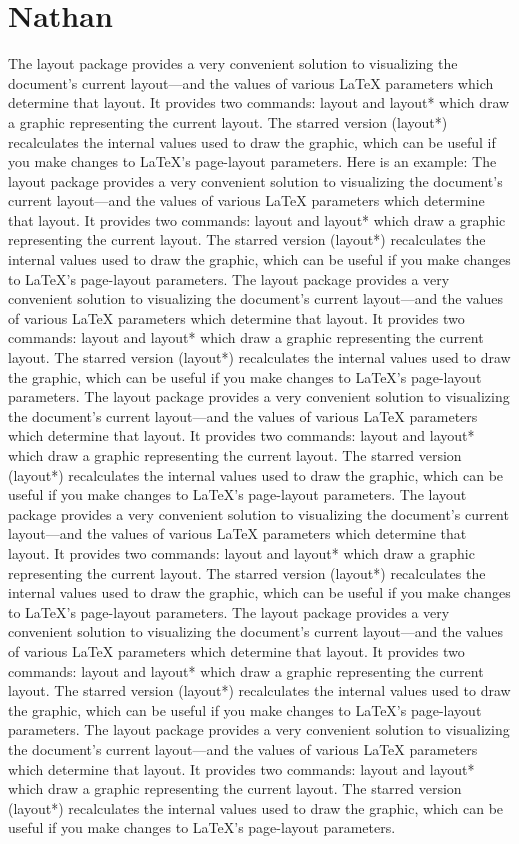 \documentclass{bduMasters}
\begin{document}
\section{Nathan}
The layout package provides a very convenient solution to visualizing the document's current layout—and the values of various LaTeX parameters which determine that layout. It provides two commands: layout and layout* which draw a graphic representing the current layout. The starred version (layout*) recalculates the internal values used to draw the graphic, which can be useful if you make changes to LaTeX's page-layout parameters. Here is an example:
The layout package provides a very convenient solution to visualizing the document's current layout—and the values of various LaTeX parameters which determine that layout. It provides two commands: layout and layout* which draw a graphic representing the current layout. The starred version (layout*) recalculates the internal values used to draw the graphic, which can be useful if you make changes to LaTeX's page-layout parameters.
The layout package provides a very convenient solution to visualizing the document's current layout—and the values of various LaTeX parameters which determine that layout. It provides two commands: layout and layout* which draw a graphic representing the current layout. The starred version (layout*) recalculates the internal values used to draw the graphic, which can be useful if you make changes to LaTeX's page-layout parameters.
The layout package provides a very convenient solution to visualizing the document's current layout—and the values of various LaTeX parameters which determine that layout. It provides two commands: layout and layout* which draw a graphic representing the current layout. The starred version (layout*) recalculates the internal values used to draw the graphic, which can be useful if you make changes to LaTeX's page-layout parameters.
The layout package provides a very convenient solution to visualizing the document's current layout—and the values of various LaTeX parameters which determine that layout. It provides two commands: layout and layout* which draw a graphic representing the current layout. The starred version (layout*) recalculates the internal values used to draw the graphic, which can be useful if you make changes to LaTeX's page-layout parameters.
The layout package provides a very convenient solution to visualizing the document's current layout—and the values of various LaTeX parameters which determine that layout. It provides two commands: layout and layout* which draw a graphic representing the current layout. The starred version (layout*) recalculates the internal values used to draw the graphic, which can be useful if you make changes to LaTeX's page-layout parameters.
The layout package provides a very convenient solution to visualizing the document's current layout—and the values of various LaTeX parameters which determine that layout. It provides two commands: layout and layout* which draw a graphic representing the current layout. The starred version (layout*) recalculates the internal values used to draw the graphic, which can be useful if you make changes to LaTeX's page-layout parameters.
\end{document}
